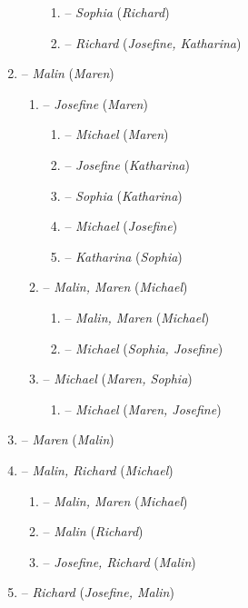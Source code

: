 \begin{enumerate}
\begin{enumerate}[label*=\arabic*.]
\begin{enumerate}[label*=\arabic*.]
		\item {} -- \textit{Sophia} (\textit{Richard})
		\item {} -- \textit{Richard} (\textit{Josefine, Katharina})
		\end{enumerate}
	\end{enumerate}
\item {} -- \textit{Malin} (\textit{Maren})
	\begin{enumerate}[label*=\arabic*.]
	\item {} -- \textit{Josefine} (\textit{Maren})
		\begin{enumerate}[label*=\arabic*.]
		\item {} -- \textit{Michael} (\textit{Maren})
		\item {} -- \textit{Josefine} (\textit{Katharina})
		\item {} -- \textit{Sophia} (\textit{Katharina})
		\item {} -- \textit{Michael} (\textit{Josefine})
		\item {} -- \textit{Katharina} (\textit{Sophia})
		\end{enumerate}
	\item {} -- \textit{Malin, Maren} (\textit{Michael})
		\begin{enumerate}[label*=\arabic*.]
		\item {} -- \textit{Malin, Maren} (\textit{Michael})
		\item {} -- \textit{Michael} (\textit{Sophia, Josefine})
		\end{enumerate}
	\item {} -- \textit{Michael} (\textit{Maren, Sophia})
		\begin{enumerate}[label*=\arabic*.]
		\item {} -- \textit{Michael} (\textit{Maren, Josefine})
		\end{enumerate}
	\end{enumerate}
\item {} -- \textit{Maren} (\textit{Malin})
\item {} -- \textit{Malin, Richard} (\textit{Michael})
	\begin{enumerate}[label*=\arabic*.]
	\item {} -- \textit{Malin, Maren} (\textit{Michael})
	\item {} -- \textit{Malin} (\textit{Richard})
	\item {} -- \textit{Josefine, Richard} (\textit{Malin})
	\end{enumerate}
\item {} -- \textit{Richard} (\textit{Josefine, Malin})
\end{enumerate}
